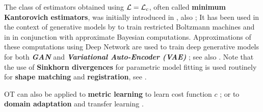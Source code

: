 \documentclass[11pt]{article}
\begin{document}
The class of estimators obtained using ${\mathcal L} = {\mathcal L}_c$, often called \textbf{minimum Kantorovich estimators}, was initially introduced in \citep{bassetti2006minimum}, also \citep{canas2012learning}; It has been used in the context of generative models by \citep{montavon2016wasserstein} to train restricted Boltzmann machines and in \citep{bernton2017inference} in conjunction with approximate Bayesian computations. Approximations of these computations using Deep Network are used to train deep generative models for both \textbf{\emph{GAN}} \citep{arjovsky2017wasserstein} and \textbf{\emph{Variational Auto-Encoder (VAE)}} \citep{tolstikhin2018wasserstein}; see also \citep{genevay2017gan, genevay2018learning, salimans2018improving}. Note that the use of \textbf{Sinkhorn divergences} for parametric model fitting is used routinely for \textbf{shape matching} and \textbf{registration}, see \citep{gold1998new, rangarajan2000applications, myronenko2010point, feydy2017optimal}.

OT can also be applied to \textbf{metric learning} to learn cost function $c$ \citep{wang2012supervised, cuturi2014ground, zen2014simultaneous, huang2016supervised}; or to \textbf{domain adaptation} \citep{flamary2016optimal} and transfer learning \citep{pan2009survey}.

\newpage


\end{document}
